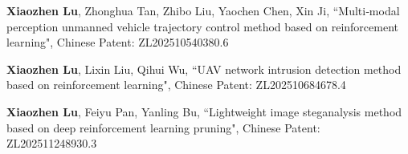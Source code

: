 \documentclass{article}
\begin{document}
\begin{justifying}
\begin{myreferences}
	
	\item \textbf{Xiaozhen Lu}, Zhonghua Tan, Zhibo Liu, Yaochen Chen, Xin Ji, ``Multi‑modal perception unmanned vehicle trajectory control method based on reinforcement learning", Chinese Patent: ZL202510540380.6
	
	
	\item \textbf{Xiaozhen Lu}, Lixin Liu, Qihui Wu, ``UAV network intrusion detection method based on reinforcement learning", Chinese Patent: ZL202510684678.4
	
	
	\item \textbf{Xiaozhen Lu}, Feiyu Pan, Yanling Bu, ``Lightweight image steganalysis method based on deep reinforcement learning pruning", Chinese Patent: ZL202511248930.3

\end{myreferences}
\end{justifying}
\end{document}
